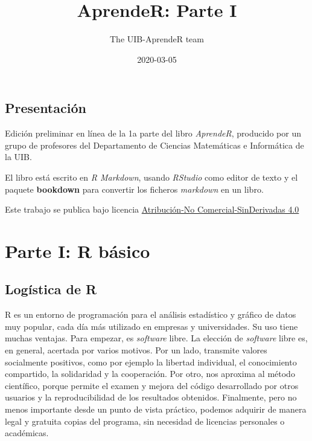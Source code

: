\documentclass[]{book}
\title{AprendeR: Parte I}
\author{The UIB-AprendeR team}
\date{2020-03-05}
\theoremstyle{definition}
\theoremstyle{definition}
\theoremstyle{definition}
\theoremstyle{remark}
\begin{document}
\maketitle

{
\setcounter{tocdepth}{1}
\tableofcontents
}
\renewcommand{\leq}{\leqslant}
\renewcommand{\geq}{\geqslant}

\hypertarget{presentacion}{%
\chapter*{Presentación}\label{presentacion}}

Edición preliminar en línea de la 1a parte del libro \emph{AprendeR}, producido por un grupo de profesores del Departamento de Ciencias Matemáticas e Informática de la UIB.

El libro está escrito en \emph{R Markdown}, usando \emph{RStudio} como editor de texto y el paquete \textbf{bookdown} para convertir los ficheros \emph{markdown} en un libro.

Este trabajo se publica bajo licencia \href{https://creativecommons.org/licenses/by-nc-nd/4.0/}{Atribución-No Comercial-SinDerivadas 4.0}

\hypertarget{part-parte-i-r-basico}{%
\part*{Parte I: R básico}\label{part-parte-i-r-basico}}

\hypertarget{chap:0}{%
\chapter{Logística de R}\label{chap:0}}

R es un entorno de programación para el análisis estadístico y gráfico de datos muy popular, cada día más utilizado en empresas y universidades. Su uso tiene muchas ventajas. Para empezar, es \emph{software} libre. La elección de \emph{software} libre es, en general, acertada por varios motivos. Por un lado, transmite valores socialmente positivos, como por ejemplo la libertad individual, el conocimiento compartido, la solidaridad y la cooperación. Por otro, nos aproxima al método científico, porque permite el examen y mejora del código desarrollado por otros usuarios y la reproducibilidad de los resultados obtenidos. Finalmente, pero no menos importante desde un punto de vista práctico, podemos adquirir de manera legal y gratuita copias del programa, sin necesidad de licencias personales o académicas.
\end{document}
